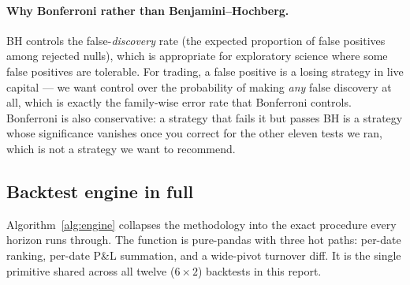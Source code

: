 \documentclass[10pt,conference,compsoc]{IEEEtran}
\begin{document}
\paragraph{Why Bonferroni rather than Benjamini--Hochberg.} BH
controls the false-\emph{discovery} rate (the expected proportion
of false positives among rejected nulls), which is appropriate for
exploratory science where some false positives are tolerable. For
trading, a false positive is a losing strategy in live capital ---
we want control over the probability of making \emph{any} false
discovery at all, which is exactly the family-wise error rate that
Bonferroni controls. Bonferroni is also conservative: a strategy
that fails it but passes BH is a strategy whose significance
vanishes once you correct for the other eleven tests we ran,
which is not a strategy we want to recommend.

\subsection{Backtest engine in full}
\label{sec:algo}

Algorithm~\ref{alg:engine} collapses the methodology into the exact
procedure every horizon runs through. The function is pure-pandas with
three hot paths: per-date ranking, per-date P\&L summation, and a
wide-pivot turnover diff. It is the single primitive shared across all
twelve ($6 \times 2$) backtests in this report.
\end{document}
